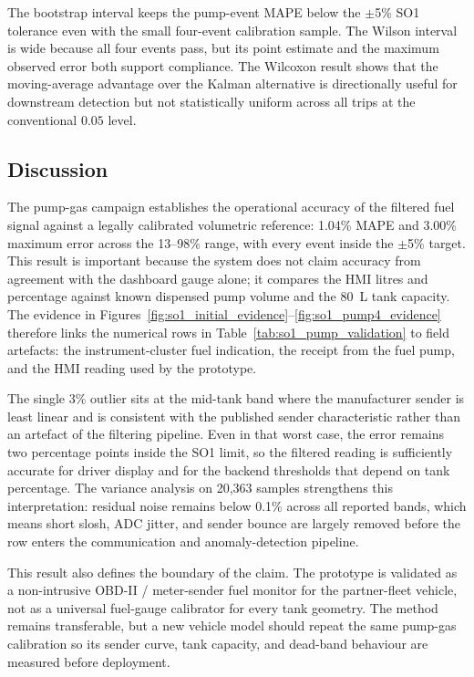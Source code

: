 The bootstrap interval keeps the pump-event MAPE below the $\pm$5\% SO1 tolerance even with the small four-event calibration sample. The Wilson interval is wide because all four events pass, but its point estimate and the maximum observed error both support compliance. The Wilcoxon result shows that the moving-average advantage over the Kalman alternative is directionally useful for downstream detection but not statistically uniform across all trips at the conventional $0.05$ level.

\FloatBarrier
\subsection{Discussion}
The pump-gas campaign establishes the operational accuracy of the filtered fuel signal against a legally calibrated volumetric reference: 1.04\% MAPE and 3.00\% maximum error across the 13--98\% range, with every event inside the $\pm$5\% target. This result is important because the system does not claim accuracy from agreement with the dashboard gauge alone; it compares the HMI litres and percentage against known dispensed pump volume and the 80~L tank capacity. The evidence in Figures~\ref{fig:so1_initial_evidence}--\ref{fig:so1_pump4_evidence} therefore links the numerical rows in Table~\ref{tab:so1_pump_validation} to field artefacts: the instrument-cluster fuel indication, the receipt from the fuel pump, and the HMI reading used by the prototype.

The single 3\% outlier sits at the mid-tank band where the manufacturer sender is least linear and is consistent with the published sender characteristic rather than an artefact of the filtering pipeline. Even in that worst case, the error remains two percentage points inside the SO1 limit, so the filtered reading is sufficiently accurate for driver display and for the backend thresholds that depend on tank percentage. The variance analysis on 20{,}363 samples strengthens this interpretation: residual noise remains below 0.1\% across all reported bands, which means short slosh, ADC jitter, and sender bounce are largely removed before the row enters the communication and anomaly-detection pipeline.

This result also defines the boundary of the claim. The prototype is validated as a non-intrusive OBD-II / meter-sender fuel monitor for the partner-fleet vehicle, not as a universal fuel-gauge calibrator for every tank geometry. The method remains transferable, but a new vehicle model should repeat the same pump-gas calibration so its sender curve, tank capacity, and dead-band behaviour are measured before deployment.

